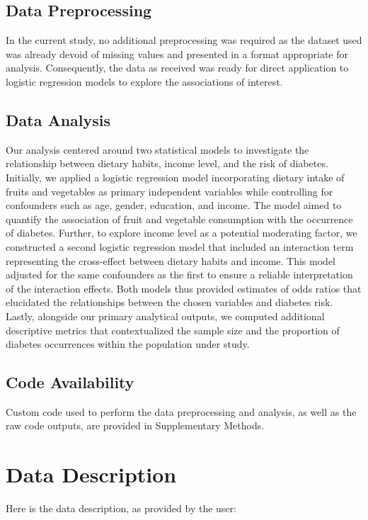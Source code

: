 \documentclass[11pt]{article}
\begin{document}
\subsection*{Data Preprocessing}
In the current study, no additional preprocessing was required as the dataset used was already devoid of missing values and presented in a format appropriate for analysis. Consequently, the data as received was ready for direct application to logistic regression models to explore the associations of interest.

\subsection*{Data Analysis}
Our analysis centered around two statistical models to investigate the relationship between dietary habits, income level, and the risk of diabetes. Initially, we applied a logistic regression model incorporating dietary intake of fruits and vegetables as primary independent variables while controlling for confounders such as age, gender, education, and income. The model aimed to quantify the association of fruit and vegetable consumption with the occurrence of diabetes. Further, to explore income level as a potential moderating factor, we constructed a second logistic regression model that included an interaction term representing the cross-effect between dietary habits and income. This model adjusted for the same confounders as the first to ensure a reliable interpretation of the interaction effects. Both models thus provided estimates of odds ratios that elucidated the relationships between the chosen variables and diabetes risk. Lastly, alongside our primary analytical outputs, we computed additional descriptive metrics that contextualized the sample size and the proportion of diabetes occurrences within the population under study.\subsection*{Code Availability}

Custom code used to perform the data preprocessing and analysis, as well as the raw code outputs, are provided in Supplementary Methods.






\clearpage
\appendix

\section{Data Description} \label{sec:data_description} Here is the data description, as provided by the user:
\end{document}
